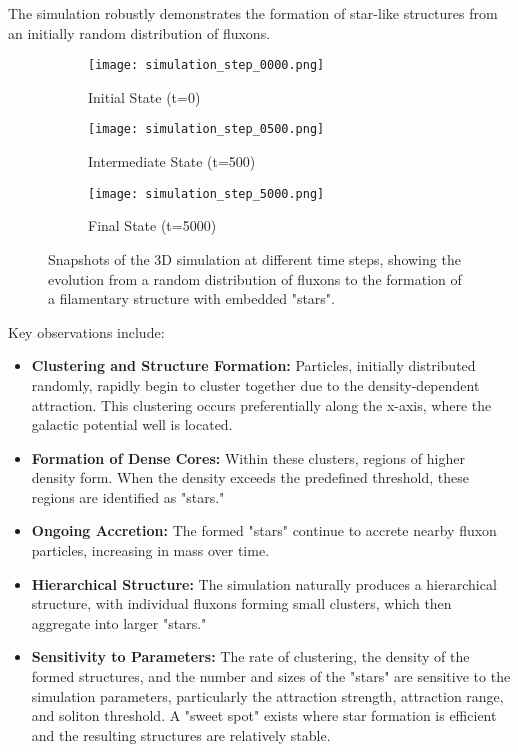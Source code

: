 \documentclass[11pt]{article}
\begin{document}
The simulation robustly demonstrates the formation of star-like structures from an initially random distribution of fluxons. \begin{figure}[h]
    \centering
    \begin{subfigure}{0.48\textwidth}
        \texttt{[image: simulation\_step\_0000.png]}
        \caption{Initial State (t=0)}
        \label{fig:initial_state}
    \end{subfigure}
    \hfill
    \begin{subfigure}{0.48\textwidth}
        \texttt{[image: simulation\_step\_0500.png]}
        \caption{Intermediate State (t=500)}
        \label{fig:intermediate_state}
    \end{subfigure}

\vspace{1em} %

    \begin{subfigure}{\textwidth}
    \centering
        \texttt{[image: simulation\_step\_5000.png]}
        \caption{Final State (t=5000)}
    \label{fig:final_state}
\end{subfigure}
    \caption{Snapshots of the 3D simulation at different time steps, showing the evolution from a random distribution of fluxons to the formation of a filamentary structure with embedded "stars".}
    \label{fig:simulation_results}
\end{figure}

Key observations include:

\begin{itemize}
    \item \textbf{Clustering and Structure Formation:} Particles, initially distributed randomly, rapidly begin to cluster together due to the density-dependent attraction. This clustering occurs preferentially along the x-axis, where the galactic potential well is located.
    \item \textbf{Formation of Dense Cores:} Within these clusters, regions of higher density form. When the density exceeds the predefined threshold, these regions are identified as "stars."
    \item \textbf{Ongoing Accretion:} The formed "stars" continue to accrete nearby fluxon particles, increasing in mass over time.
        \item \textbf{Hierarchical Structure:} The simulation naturally produces a hierarchical structure, with individual fluxons forming small clusters, which then aggregate into larger "stars."
    \item \textbf{Sensitivity to Parameters:} The rate of clustering, the density of the formed structures, and the number and sizes of the "stars" are sensitive to the simulation parameters, particularly the attraction strength, attraction range, and soliton threshold. A "sweet spot" exists where star formation is efficient and the resulting structures are relatively stable.
\end{itemize}
\end{document}
